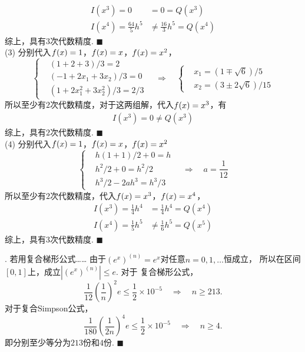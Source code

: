   \[\begin{split}
    I(x^3) = 0 &= 0 = Q(x^3)\\
    I(x^4) = \frac{64}{5}h^5 &\ne \frac{16}{3}h^5 = Q(x^4)
  \end{split}\]
  综上，具有$3$次代数精度. $\blacksquare$\\
  (3) 分别代入$\mathnormal{f}(x) = 1$，$\mathnormal{f}(x) = x$，$\mathnormal{f}(x) = x^2$，
  \[
    \begin{cases}
      & (1+2+3)/3 = 2 \\
      & (-1 + 2x_1 + 3x_2)/3 = 0\\
      & (1 + 2x_1^2 + 3x_2^2)/3 = 2/3
    \end{cases}
    \quad\Rightarrow\quad
    \begin{cases}
      &x_1 = (1\mp\sqrt{6})/5 \\
      &x_2 = (3\pm 2\sqrt{6})/15
    \end{cases}
  \]
  所以至少有$2$次代数精度，对于这两组解，代入$\mathnormal{f}(x)=x^3$，有
  \[\begin{split}
    I(x^3) = 0 \ne Q(x^3)
  \end{split}\]
  综上，具有$2$次代数精度. $\blacksquare$\\
  (4) 分别代入$\mathnormal{f}(x)=1$，$\mathnormal{f}(x)=x$，$\mathnormal{f}(x)=x^2$
  \[
    \begin{cases}
      & h(1 + 1)/2 + 0 = h \\
      & h^2/2 + 0 = h^2/2 \\
      & h^3/2 - 2ah^3 = h^3/3
    \end{cases}
    \quad\Rightarrow\quad
    a = \frac{1}{12}
  \]
  所以至少有$2$次代数精度，代入$\mathnormal{f}(x)=x^3$，$\mathnormal{f}(x)=x^4$，
  \[\begin{split}
    I(x^3) = \frac{1}{4}h^4 &= \frac{1}{4}h^4 = Q(x^4)\\
    I(x^4) = \frac{1}{5}h^5 &\ne \frac{1}{6}h^5 = Q(x^5)
  \end{split}\]
  综上，具有$3$次代数精度. $\blacksquare$

\vspace{1cm}
\par{}. 若用复合梯形公式……
\ans
  由于$(e^x)^{(n)} = e^x$对任意$n = 0,1,\dots$恒成立，
  所以在区间$[0,1]$上，成立$|(e^x)^{(n)}| \le e$. 对于
  复合梯形公式，
  \[
    \frac{1}{12}\left(\frac{1}{n}\right)^2e \le \frac{1}{2} \times 10^{-5}
    \quad\Rightarrow\quad n\ge 213.
  \]
  对于复合Simpson公式，
  \[
    \frac{1}{180}\left(\frac{1}{2n}\right)^4e \le \frac{1}{2} \times 10^{-5}
    \quad\Rightarrow\quad n \ge 4.
  \]
  即分别至少等分为$213$份和$4$份. $\blacksquare$

